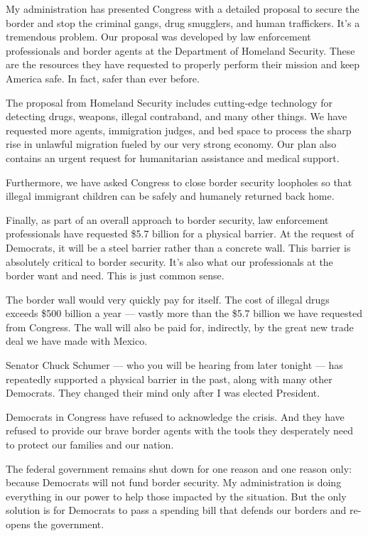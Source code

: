 \documentclass[10pt,a4paper]{article}
\begin{document}
My administration has presented Congress with a detailed proposal to secure the border and stop the criminal gangs, drug smugglers, and human traffickers.  It’s a tremendous problem.  Our proposal was developed by law enforcement professionals and border agents at the Department of Homeland Security.  These are the resources they have requested to properly perform their mission and keep America safe.  In fact, safer than ever before.

The proposal from Homeland Security includes cutting-edge technology for detecting drugs, weapons, illegal contraband, and many other things.  We have requested more agents, immigration judges, and bed space to process the sharp rise in unlawful migration fueled by our very strong economy.  Our plan also contains an urgent request for humanitarian assistance and medical support.

Furthermore, we have asked Congress to close border security loopholes so that illegal immigrant children can be safely and humanely returned back home.

Finally, as part of an overall approach to border security, law enforcement professionals have requested \$5.7 billion for a physical barrier.  At the request of Democrats, it will be a steel barrier rather than a concrete wall.  This barrier is absolutely critical to border security.  It’s also what our professionals at the border want and need.  This is just common sense.

The border wall would very quickly pay for itself.   The cost of illegal drugs exceeds \$500 billion a year — vastly more than the \$5.7 billion we have requested from Congress.  The wall will also be paid for, indirectly, by the great new trade deal we have made with Mexico.

Senator Chuck Schumer — who you will be hearing from later tonight — has repeatedly supported a physical barrier in the past, along with many other Democrats.  They changed their mind only after I was elected President.

Democrats in Congress have refused to acknowledge the crisis.  And they have refused to provide our brave border agents with the tools they desperately need to protect our families and our nation.

The federal government remains shut down for one reason and one reason only: because Democrats will not fund border security.
My administration is doing everything in our power to help those impacted by the situation.  But the only solution is for Democrats to pass a spending bill that defends our borders and re-opens the government.
\end{document}
